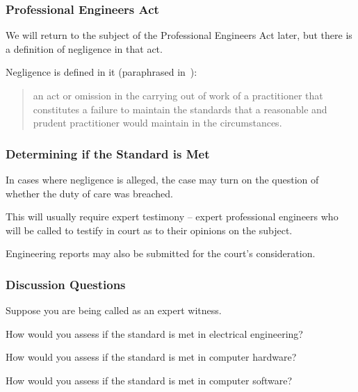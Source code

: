 \begin{frame}
\frametitle{Professional Engineers Act}

We will return to the subject of the Professional Engineers Act later, but there is a definition of negligence in that act.

Negligence is defined in it (paraphrased in~\cite{lpe}):
\begin{quote}
 an act or omission in the carrying out of work of a practitioner that constitutes a failure to maintain the standards that a reasonable and prudent practitioner would maintain in the circumstances.
 \end{quote}

\end{frame}



\begin{frame}
\frametitle{Determining if the Standard is Met}

In cases where negligence is alleged, the case may turn on the question of whether the duty of care was breached.

This will usually require expert testimony -- expert professional engineers who will be called to testify in court as to their opinions on the subject.

Engineering reports may also be submitted for the court's consideration.

\end{frame}



\begin{frame}
\frametitle{Discussion Questions}

Suppose you are being called as an expert witness.

How would you assess if the standard is met in electrical engineering?

How would you assess if the standard is met in computer hardware?

How would you assess if the standard is met in computer software?

\end{frame}




